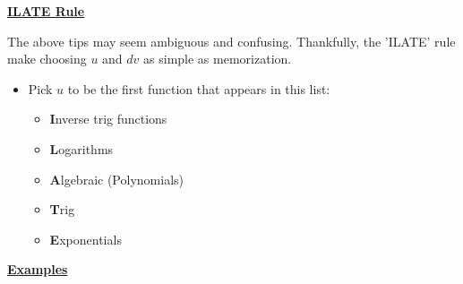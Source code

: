 \documentclass{letter}
\begin{document}
	\underline{\textbf{ILATE Rule}}
	
	The above tips may seem ambiguous and confusing. Thankfully, the 'ILATE' rule make choosing $u$ and $dv$ as simple as memorization.
	
	\begin{itemize}
		\item Pick $u$ to be the first function that appears in this list:\begin{itemize}
			\item \textbf{I}nverse trig functions
			\item \textbf{L}ogarithms
			\item \textbf{A}lgebraic (Polynomials)
			\item \textbf{T}rig
			\item \textbf{E}xponentials
		\end{itemize}
	\end{itemize}
	
	\clearpage
	
	\underline{\textbf{Examples}}
	
\end{document}
